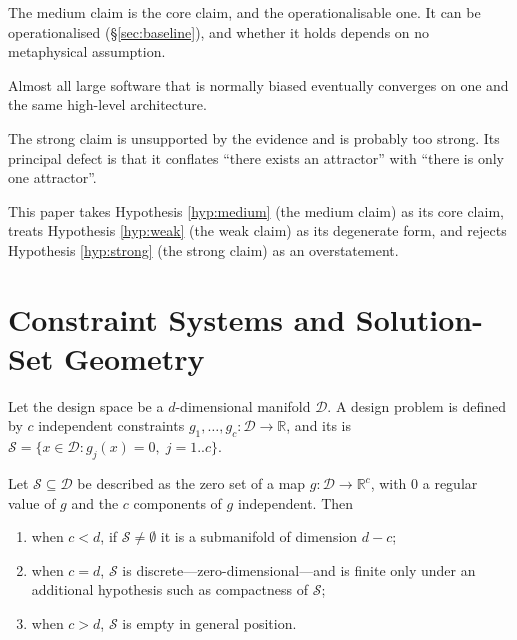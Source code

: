 The medium claim is the core claim, and the operationalisable one. It can be operationalised
(\S\ref{sec:baseline}), and whether it holds depends on no metaphysical assumption.

\begin{hypothesis}\label{hyp:strong}
Almost all large software that is normally biased eventually converges on one and the same
high-level architecture.
\end{hypothesis}

The strong claim is unsupported by the evidence and is probably too strong. Its principal
defect is that it conflates ``there exists an attractor'' with ``there is only one
attractor''.

This paper takes Hypothesis \ref{hyp:medium} (the medium claim) as its core claim, treats
Hypothesis \ref{hyp:weak} (the weak claim) as its degenerate form, and rejects
Hypothesis \ref{hyp:strong} (the strong claim) as an overstatement.

\section{Constraint Systems and Solution-Set Geometry}\label{sec:overconstrain}

\begin{definition}\label{def:constraint}
Let the design space be a $d$-dimensional manifold $\mathcal{D}$. A design problem is
defined by $c$ independent constraints
$g_1, \dots, g_c : \mathcal{D} \to \mathbb{R}$, and its  is
$\mathcal{S} = \{x \in \mathcal{D} : g_j(x) = 0,\; j = 1..c\}$.
\end{definition}

\begin{proposition}\label{prop:overconstrain}
Let $\mathcal{S} \subseteq \mathcal{D}$ be described as the zero set of a map
$g : \mathcal{D} \to \mathbb{R}^{c}$, with $0$ a regular value of $g$ and the $c$ components of $g$
independent. Then
\begin{enumerate}[label=(\alph*)]
\item when $c < d$, if $\mathcal{S} \ne \emptyset$ it is a submanifold of dimension $d - c$;
\item when $c = d$, $\mathcal{S}$ is discrete---zero-dimensional---and is finite only under an
      additional hypothesis such as compactness of $\mathcal{S}$;
\item when $c > d$, $\mathcal{S}$ is empty in general position.
\end{enumerate}
\end{proposition}

